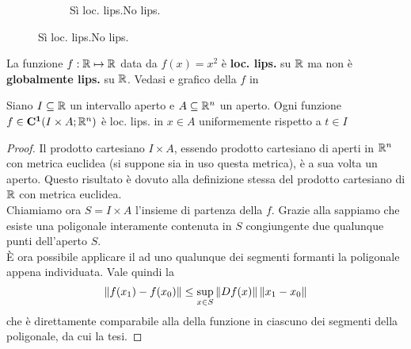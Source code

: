 \begin{example}
\begin{figure}[H]
\begin{subfigure}{.24\textwidth}
{
			}
			\caption{Sì loc. lips.\newline No lips.}
		\end{subfigure}
	\end{figure}
\end{example}
\begin{example}
	La funzione $f:\mathbb{R}\mapsto\mathbb{R}$ data da $f(x)=x^2$ è \textbf{loc. lips.} su $\mathbb{R}$ ma non è \textbf{globalmente lips.} su $\mathbb{R}$. Vedasi  e grafico della $f$ in 
\end{example}

\begin{proposition}
	\label{prop:fc1_loc_lips}
	Siano $I\subseteq \mathbb{R}$ un intervallo aperto e $A\subseteq \mathbb{R}^n$ un aperto. Ogni funzione $f\in\mathbf{C^{1}}(I\times A;\mathbb{R}^n)$ è loc. lips. in $x\in A$ uniformemente rispetto a $t\in I$
	\begin{proof}
		Il prodotto cartesiano $I\times A$, essendo prodotto cartesiano di aperti in $\mathbb{R}^n$ con metrica euclidea (si suppone sia in uso questa metrica), è a sua volta un aperto. Questo risultato è dovuto alla definizione stessa del prodotto cartesiano di $\mathbb{R}$ con metrica euclidea.\\
		Chiamiamo ora $S=I\times A$ l'insieme di partenza della $f$. Grazie alla  sappiamo che esiste una poligonale interamente contenuta in $S$ congiungente due qualunque punti dell'aperto $S$.\\
		È ora possibile applicare il  ad uno qualunque dei segmenti formanti la poligonale appena individuata. Vale quindi la
		$$\left\|f(x_1)-f(x_0)\right\|\le \sup\limits_{x\in S}\left\|Df(x)\right\|\left\|x_1-x_0\right\|$$
		che è direttamente comparabile alla  della funzione in ciascuno dei segmenti della poligonale, da cui la tesi.
	\end{proof}
\end{proposition}

